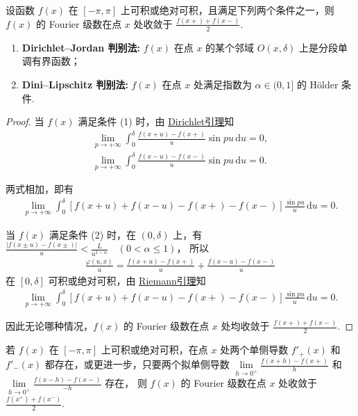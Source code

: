 \documentclass[../../main.tex]{subfiles}%
\begin{document}
\begin{theorem}
设函数 $f(x)$ 在 $[-\pi, \pi]$ 上可积或绝对可积，且满足下列两个条件之一，则 $f(x)$ 的 Fourier 级数在点 $x$ 处收敛于
$\frac{f(x+)+f(x-)}{2}$.
\begin{enumerate}[(1)]
\item \textbf{Dirichlet--Jordan 判别法:} $f(x)$ 在点 $x$ 的某个邻域 $O(x, \delta)$ 上是分段单调有界函数；
\item \textbf{Dini--Lipschitz 判别法:} $f(x)$ 在点 $x$ 处满足指数为 $\alpha \in (0, 1]$ 的 Hölder 条件.
\end{enumerate}
\end{theorem}
\begin{proof}

当 $f(x)$ 满足条件 (1) 时，由 \hyperref[theorem:Dirichlet引理]{Dirichlet引理}知
\begin{align*}
\lim_{p \to +\infty} \int_0^\delta \frac{f(x + u) - f(x+)}{u} \sin p u \,\mathrm{d}u = 0, \\
\lim_{p \to +\infty} \int_0^\delta \frac{f(x - u) - f(x-)}{u} \sin p u \,\mathrm{d}u = 0.
\end{align*}

两式相加，即有
\begin{align*}
\lim_{p \to +\infty} \int_0^\delta \left[ f(x + u) + f(x - u) - f(x+) - f(x-) \right] \frac{\sin p u}{u} \,\mathrm{d}u = 0.
\end{align*}

当 $f(x)$ 满足条件 (2) 时，在 $(0, \delta)$ 上，有
$\frac{|f(x \pm u) - f(x \pm)|}{u} < \frac{L}{u^{1-\alpha}} \quad (0 < \alpha \leqslant 1)$，
所以
\begin{align*}
\frac{\varphi(u, x)}{u} = \frac{f(x + u) - f(x+)}{u} + \frac{f(x - u) - f(x-)}{u}
\end{align*}
在 $[0, \delta]$ 可积或绝对可积，由 \hyperref[lemma:Riemann-Lebesgue引理]{Riemann引理}知
\begin{align*}
\lim_{p \to +\infty} \int_0^\delta \left[ f(x + u) + f(x - u) - f(x+) - f(x-) \right] \frac{\sin p u}{u} \,\mathrm{d}u = 0.
\end{align*}

因此无论哪种情况，$f(x)$ 的 Fourier 级数在点 $x$ 处均收敛于
$\frac{f(x+) + f(x-)}{2}$.
\end{proof}

\begin{corollary}
若 $f(x)$ 在 $[-\pi, \pi]$ 上可积或绝对可积，在点 $x$ 处两个单侧导数 $f'_+(x)$ 和 $f'_-(x)$ 都存在，或更进一步，只要两个拟单侧导数
$\lim\limits_{h \to 0^+} \frac{f(x+h)-f(x+)}{h}$ 和 $\lim\limits_{h \to 0^+} \frac{f(x-h)-f(x-)}{-h}$ 存在，
则 $f(x)$ 的 Fourier 级数在点 $x$ 处收敛于
$\frac{f(x^+) + f(x^-)}{2}$.
\end{corollary}
\end{document}
